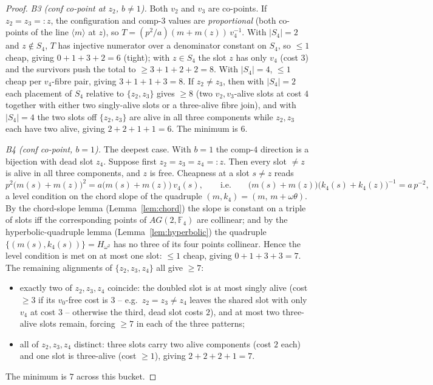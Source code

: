 \documentclass[11pt]{article}
\newcommand{\F}[1]{\mathbb{F}_{#1}}
\theoremstyle{plain}
\theoremstyle{definition}
\theoremstyle{remark}
\begin{document}
\begin{proof}
\smallskip
\noindent\emph{B3 (conf co-point at $z_2$, $b\ne 1$).}
Both $v_2$ and $v_3$ are co-points. If $z_2=z_3=:z$, the configuration and comp-$3$ values
are \emph{proportional} (both co-points of the line $\langle m\rangle$ at $z$), so
$T=(p^2/a)(m+m(z))\,v_4^{-1}$. With $|S_4|=2$ and $z\notin S_4$, $T$ has injective numerator
over a denominator constant on $S_4$, so $\le 1$ cheap, giving $0+1+3+2=6$ (tight); with
$z\in S_4$ the slot $z$ has only $v_4$ (cost $3$) and the survivors push the total to
$\ge 3+1+2+2=8$. With $|S_4|=4$, $\le 1$ cheap per $v_4$-fibre pair, giving $3+1+1+3=8$.
If $z_2\ne z_3$, then with $|S_4|=2$ each placement of $S_4$ relative to $\{z_2,z_3\}$ gives
$\ge 8$ (two $v_2,v_3$-alive slots at cost $4$ together with either two singly-alive slots
or a three-alive fibre join), and with $|S_4|=4$ the two slots off $\{z_2,z_3\}$ are alive in
all three components while $z_2,z_3$ each have two alive, giving $2+2+1+1=6$. The minimum
is $6$.

\smallskip
\noindent\emph{B4 (conf co-point, $b=1$).}
The deepest case. With $b=1$ the comp-$4$ direction is a bijection with dead slot $z_4$.
Suppose first $z_2=z_3=z_4=:z$. Then every slot $\ne z$ is alive in all three components,
and $z$ is free. Cheapness at a slot $s\ne z$ reads
\[
  p^2\bigl(m(s)+m(z)\bigr)^2=a\bigl(m(s)+m(z)\bigr)\,v_4(s),
  \qquad\text{i.e.}\qquad
  \bigl(m(s)+m(z)\bigr)\bigl(k_4(s)+k_4(z)\bigr)^{-1}=a\,p^{-2},
\]
a level condition on the chord slope of the quadruple $(m,k_4)=(m,\,m+\omega\theta)$.
By the chord-slope lemma (Lemma~\ref{lem:chord}) the slope is constant on a triple of slots
iff the corresponding points of $AG(2,\F4)$ are collinear; and by the hyperbolic-quadruple
lemma (Lemma~\ref{lem:hyperbolic}) the quadruple $\{(m(s),k_4(s))\}=H_{\omega^2}$ has no
three of its four points collinear. Hence the level condition is met on at most one slot:
$\le 1$ cheap, giving $0+1+3+3=7$. The remaining alignments of $\{z_2,z_3,z_4\}$ all give
$\ge 7$:
\begin{itemize}[leftmargin=2em]
  \item exactly two of $z_2,z_3,z_4$ coincide: the doubled slot is at most singly alive
        (cost $\ge 3$ if its $v_0$-free cost is $3$ -- e.g.\ $z_2=z_3\ne z_4$ leaves the
        shared slot with only $v_4$ at cost $3$ -- otherwise the third, dead slot costs $2$),
        and at most two three-alive slots remain, forcing $\ge 7$ in each of the three
        patterns;
  \item all of $z_2,z_3,z_4$ distinct: three slots carry two alive components (cost $2$
        each) and one slot is three-alive (cost $\ge 1$), giving $2+2+2+1=7$.
\end{itemize}
The minimum is $7$ across this bucket.


\end{proof}
\end{document}
